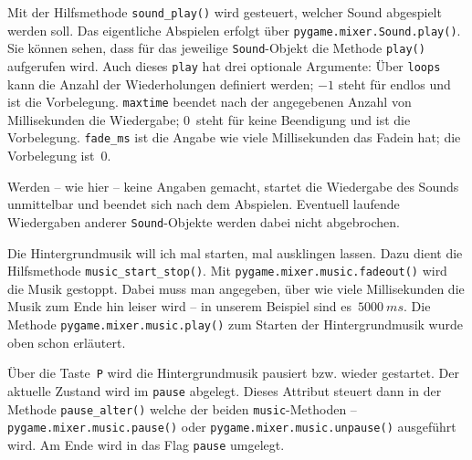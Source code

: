 Mit der Hilfsmethode \texttt{sound\_play()} wird gesteuert, welcher Sound abgespielt werden soll. Das eigentliche Abspielen erfolgt über \texttt{pygame.mixer.Sound.play()}. Sie können sehen, dass für das jeweilige \texttt{Sound}-Objekt die Methode \texttt{play()} aufgerufen wird. Auch dieses \texttt{play} hat drei optionale Argumente: Über \texttt{loops} kann die Anzahl der Wiederholungen definiert werden; $-1$ steht für endlos und ist die Vorbelegung. \texttt{maxtime} beendet nach der angegebenen Anzahl von Millisekunden die Wiedergabe; $0$~steht für keine Beendigung und ist die Vorbelegung. \texttt{fade\_ms} ist die Angabe wie viele Millisekunden das Fadein hat; die Vorbelegung ist~$0$.

Werden -- wie hier -- keine Angaben gemacht, startet die Wiedergabe des Sounds unmittelbar und beendet sich nach dem Abspielen. Eventuell laufende Wiedergaben anderer \texttt{Sound}-Objekte werden dabei nicht abgebrochen.


Die Hintergrundmusik will ich mal starten, mal ausklingen lassen. Dazu dient die Hilfsmethode \texttt{music\_start\_stop()}. Mit  \texttt{pygame.mixer.music.fadeout()} wird die Musik gestoppt. Dabei muss man angegeben, über wie viele Millisekunden die Musik zum Ende hin leiser wird -- in unserem Beispiel sind es~$5000~ms$. Die Methode \texttt{pygame.mixer.music\-.play()} zum Starten der Hintergrundmusik wurde oben schon erläutert.

\newpage


Über die Taste~\texttt{P} wird die Hintergrundmusik pausiert bzw. wieder gestartet. Der aktuelle Zustand wird im \texttt{pause} abgelegt. Dieses Attribut steuert dann in der Methode \texttt{pause\_alter()} welche der beiden \texttt{music}-Methoden --  \texttt{pygame.mixer.music.pause()} oder \texttt{pygame.mixer.music.unpause()} ausgeführt wird. Am Ende wird in  das Flag \texttt{pause} umgelegt.

